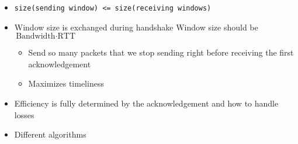 \begin{itemize}
        \begin{itemize}
             Prevent overwhelmingness of receiver and of network
             Restrict the sender and receiver buffer to a certain size
             List of sequence numbers the sender is allowed to send
                \begin{itemize}
                    \item Move forward iff the lowest packet number in the windows was acknowledged
                     Prevent overwhelming network
                \end{itemize}
             List of sequence numbers the receiver is allowed to receive
                \begin{itemize}
                    \item If lowest packet number in the window is received:
                        \begin{itemize}
                            \item Send acknowledgement for that packet
                            \item Move sending window forward
                        \end{itemize}
                     Prevent overwhelming receiver
                \end{itemize}
            \item \verb+size(sending window) <= size(receiving windows)+
            \item Window size is exchanged during handshake
             Window size should be $\text{Bandwidth} \cdot \text{RTT}$
                \begin{itemize}
                    \item Send so many packets that we stop sending right before receiving the first acknowledgement
                    \item Maximizes timeliness
                \end{itemize}
        \end{itemize}
        \begin{itemize}
            \item Efficiency is fully determined by the acknowledgement and how to handle losses
            \item Different algorithms

\end{itemize}
\end{itemize}
